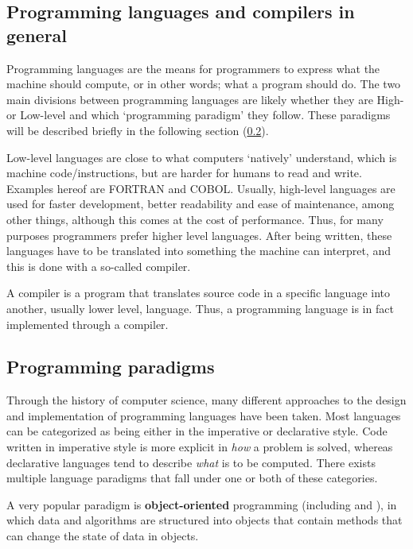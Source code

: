 
\subsection{Programming languages and compilers in general}
Programming languages are the means for programmers to express what the machine should compute, or in other words; what a program should do.
The two main divisions between programming languages are likely whether they are High- or Low-level and which `programming paradigm' they follow. These paradigms will be described briefly in the following section (\ref{sec:paradigms}).

Low-level languages are close to what computers `natively' understand, which is machine code/instructions, but are harder for humans to read and write. Examples hereof are FORTRAN and COBOL. Usually, high-level languages are used for faster development, better readability and ease of maintenance, among other things, although this comes at the cost of performance. Thus, for many purposes programmers prefer higher level languages. After being written, these languages have to be translated into something the machine can interpret, and this is done with a so-called compiler.

A compiler is a program that translates source code in a specific language into another, usually lower level, language. Thus, a programming language is in fact implemented through a compiler.


\subsection{Programming paradigms}
\label{sec:paradigms}
Through the history of computer science, many different approaches to the design and implementation of programming languages have been taken. Most languages can be categorized as being either in the imperative or declarative style. Code written in imperative style is more explicit in \emph{how} a problem is solved, whereas declarative languages tend to describe \emph{what} is to be computed. There exists multiple language paradigms that fall under one or both of these categories.

A very popular paradigm is \textbf{object-oriented} programming (including  and ), in which data and algorithms are structured into objects that contain methods that can change the state of data in objects.

